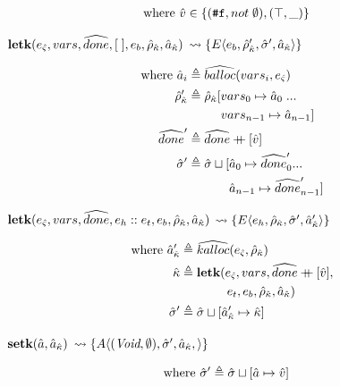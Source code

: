 \documentclass[12pt,draft]{article}
\newcommand\mdoubleplus{\ensuremath{\mathbin{+\mkern-9mu+}}}
\newcommand{\falsesyn}{\texttt{\#f}}
\newcommand{\E}[4]{E\langle #1 , #2 , #3 , #4 \rangle}
\newcommand{\A}[4]{A\langle #1 , #2 , #3 , #4 \rangle}
\begin{document}
\begin{multicols*}{2}
\begin{align*}
\text{where } \aval &\in \{(\falsesyn, not\;\emptyset) , (\top, \_)\}
\end{align*}
\begin{center}
  $\textbf{letk}(e_{\hat{\varsigma}}, vars, \widehat{done}, [\;], e_b,\hat{\rho}_{\hat{\kappa}} , \hat{a}_{\hat{\kappa}})$
  $\leadsto \{\E{e_b}{\aenv_{\akont}'}{\astore'}{\akaddr}\}$
\end{center}
\vspace{-7mm}
\begin{align*}
  \text{where }
  \abaddr_i &\triangleq \aballoc{vars_i , \ectrl} \\
  \aenv_{\akont}' &\triangleq \aenv_{\akont}[vars_0 \mapsto \abaddr_0\;... \\
            &\;\;\;\;\;\;\;\;\;\, vars_{n-1} \mapsto \abaddr_{n-1}] \\
  \adone' &\triangleq \adone \mdoubleplus [\aval] \\
  \astore' &\triangleq \astore \sqcup [\abaddr_0 \mapsto \adone'_0 ... \\
  &\;\;\;\;\;\;\;\;\;\;\;\; \abaddr_{n-1} \mapsto \adone'_{n-1}]
\end{align*}
\begin{center}
  $\textbf{letk}(e_{\hat{\varsigma}} , vars , \widehat{done} , e_h::e_t , e_b,\hat{\rho}_{\hat{\kappa}} , \hat{a}_{\hat{\kappa}})$
  $\leadsto \{\E{e_h}{\aenv_{\akont}}{\astore'}{\akaddr'}\}$
\end{center}
\vspace{-7mm}
\begin{align*}
  \text{where }
  \akaddr' &\triangleq \akalloc{\ectrl, \aenv_{\akont}} \\
  \akont &\triangleq \textbf{letk}(\ectrl, vars , \adone \mdoubleplus [\aval], \\
  &\;\;\;\;\;\;\;\;\;\;\;\;\;\, e_t , e_b , \aenv_{\akont} , \akaddr) \\
  \astore' &\triangleq \astore \sqcup [\akaddr' \mapsto \akont]
\end{align*}
\begin{center}
  $\textbf{setk}(\hat{a} , \hat{a}_{\hat{\kappa}})$
  $\leadsto \{\A{(\textit{Void} , \emptyset)}{\astore'}{\akaddr}{}\}$
\end{center}
\vspace{-7mm}
\begin{align*}
  \text{where }
  \hat{\sigma}' &\triangleq \hat{\sigma} \sqcup [ \hat{a} \mapsto \hat{v} ]
\end{align*}


\end{multicols*}
\end{document}
